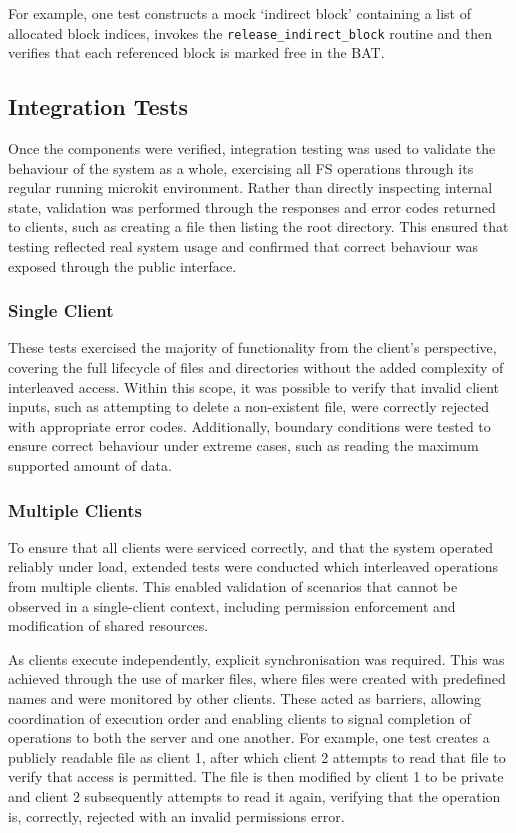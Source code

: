 For example, one test constructs a mock `indirect block' containing a list of allocated block indices, invokes the \texttt{release\_indirect\_block} routine and then verifies that each referenced block is marked free in the BAT.

\newpage
\subsection{Integration Tests}

Once the components were verified, integration testing was used to validate the behaviour of the system as a whole, exercising all FS operations through its regular running microkit environment. Rather than directly inspecting internal state, validation was performed through the responses and error codes returned to clients, such as creating a file then listing the root directory. This ensured that testing reflected real system usage and confirmed that correct behaviour was exposed through the public interface.


\subsubsection{Single Client}

These tests exercised the majority of functionality from the client’s perspective, covering the full lifecycle of files and directories without the added complexity of interleaved access. Within this scope, it was possible to verify that invalid client inputs, such as attempting to delete a non-existent file, were correctly rejected with appropriate error codes. Additionally, boundary conditions were tested to ensure correct behaviour under extreme cases, such as reading the maximum supported amount of data.

\subsubsection{Multiple Clients}

To ensure that all clients were serviced correctly, and that the system operated reliably under load, extended tests were conducted which interleaved operations from multiple clients. This enabled validation of scenarios that cannot be observed in a single-client context, including permission enforcement and modification of shared resources.

As clients execute independently, explicit synchronisation was required. This was achieved through the use of marker files, where files were created with predefined names and were monitored by other clients. These acted as barriers, allowing coordination of execution order and enabling clients to signal completion of operations to both the server and one another. For example, one test creates a publicly readable file as client 1, after which client 2 attempts to read that file to verify that access is permitted. The file is then modified by client 1 to be private and client 2 subsequently attempts to read it again, verifying that the operation is, correctly, rejected with an invalid permissions error.

